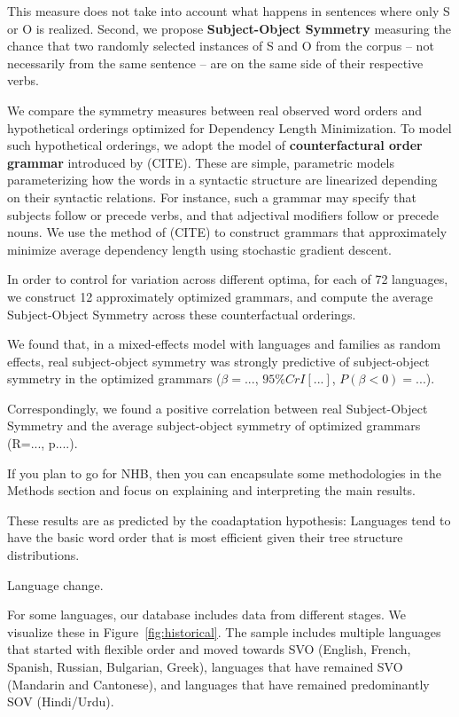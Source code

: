 \documentclass[11pt,a4paper]{article}
\newcommand{\key}[1]{\textbf{#1}}
\begin{document}
This measure does not take into account what happens in sentences where only S or O is realized.
Second, we propose \key{Subject-Object Symmetry} measuring the chance that two randomly selected instances of S and O from the corpus -- not necessarily from the same sentence -- are on the same side of their respective verbs.


We compare the symmetry measures between real observed word orders and hypothetical orderings optimized for Dependency Length Minimization.
To model such hypothetical orderings, we adopt the model of \key{counterfactural order grammar} introduced by (CITE).
These are simple, parametric models parameterizing how the words in a syntactic structure are linearized depending on their syntactic relations.
For instance, such a grammar may specify that subjects follow or precede verbs, and that adjectival modifiers follow or precede nouns.
We use the method of (CITE) to construct grammars that approximately minimize average dependency length using stochastic gradient descent.


In order to control for variation across different optima, for each of 72 languages, we construct 12 approximately optimized grammars, and compute the average Subject-Object Symmetry across these counterfactual orderings.

We found that, in a mixed-effects model with languages and families as random effects, real subject-object symmetry was strongly predictive of subject-object symmetry in the optimized grammars ($\beta = ...$, $95\% CrI [...]$, $P(\beta<0) = ...$).


Correspondingly, we found a positive correlation between real Subject-Object Symmetry and the average subject-object symmetry of optimized grammars (R=..., p....).


{\color{blue} If you plan to go for NHB, then you can encapsulate some methodologies in the Methods section and focus on explaining and interpreting the main results.}

These results are as predicted by the coadaptation hypothesis: Languages tend to have the basic word order that is most efficient given their tree structure distributions.

Language change.

For some languages, our database includes data from different stages.
We visualize these in Figure~\ref{fig:historical}.
The sample includes multiple languages that started with flexible order and moved towards SVO (English, French, Spanish, Russian, Bulgarian, Greek), languages that have remained SVO (Mandarin and Cantonese), and languages that have remained predominantly SOV (Hindi/Urdu).
\end{document}
